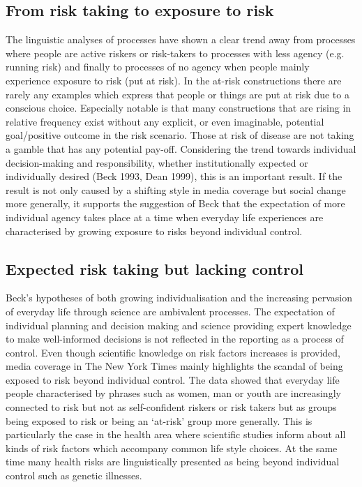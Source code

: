 \subsection*{From risk taking to exposure to risk}

The linguistic analyses of processes have shown a clear trend away from processes where people are active riskers or risk-takers to processes with less agency (e.g. running risk) and finally to processes of no agency when people mainly experience exposure to risk (put at risk). In the at-risk constructions there are rarely any examples which express that people or things are put at risk due to a conscious choice. Especially notable is that many constructions that are rising in relative frequency exist without any explicit, or even imaginable, potential goal\slash positive outcome in the risk scenario. Those at risk of disease are not taking a gamble that has any potential pay-off. Considering the trend towards individual decision-making and responsibility, whether institutionally expected or individually desired (Beck 1993, Dean 1999), this is an important result. If the result is not only caused by a shifting style in media coverage but social change more generally, it supports the suggestion of Beck that the expectation of more individual agency takes place at a time when everyday life experiences are characterised by growing exposure to risks beyond individual control.

\subsection*{Expected risk taking but lacking control}

Beck's hypotheses of both growing individualisation and the increasing pervasion of everyday life through science are ambivalent processes. The expectation of individual planning and decision making and science providing expert knowledge to make well-informed decisions is not reflected in the reporting as a process of control. Even though scientific knowledge on risk factors increases is provided, media coverage in The New York Times mainly highlights the scandal of being exposed to risk beyond individual control. The data showed that everyday life people characterised by phrases such as women, man or youth are increasingly connected to risk but not as self-confident riskers or risk takers but as groups being exposed to risk or being an `at-risk' group more generally. This is particularly the case in the health area where scientific studies inform about all kinds of risk factors which accompany common life style choices. At the same time many health risks are linguistically presented as being beyond individual control such as genetic illnesses.

